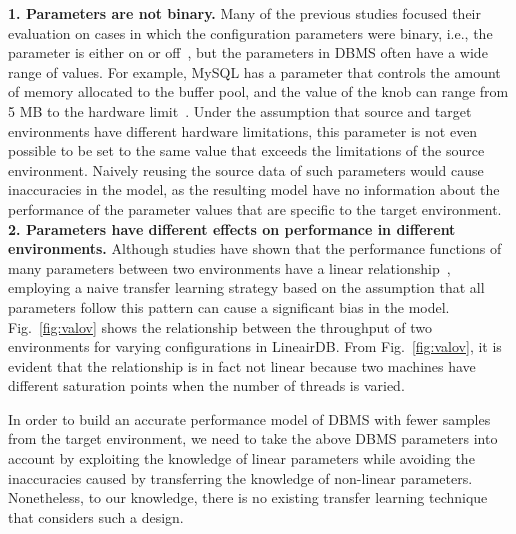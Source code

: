 \textbf{1. Parameters are not binary.}
Many of the previous studies focused their evaluation on cases in which the configuration parameters were binary, i.e., the parameter is either on or off~\cite{Valov, jamshidi, l2s}, but the parameters in DBMS often have a wide range of values.
For example, MySQL has a parameter that controls the amount of memory allocated to the buffer pool, and the value of the knob can range from 5 MB to the hardware limit~\cite{mysqlinnobuf}.
Under the assumption that source and target environments have different hardware limitations, this parameter is not even possible to be set to the same value that exceeds the limitations of the source environment.
Naively reusing the source data of such parameters would cause inaccuracies in the model, as the resulting model have no information about the performance of the parameter values that are specific to the target environment.
\textbf{2. Parameters have different effects on performance in different environments.}
Although studies have shown that the performance functions of many parameters between two environments have a linear relationship~\cite{Valov, jamshidi}, employing a naive transfer learning strategy based on the assumption that all parameters follow this pattern can cause a significant bias in the model.
Fig.~\ref{fig:valov} shows the relationship between the throughput of two environments for varying configurations in LineairDB.
From Fig.~\ref{fig:valov}, it is evident that the relationship is in fact not linear because two machines have different saturation points when the number of threads is varied.

In order to build an accurate performance model of DBMS with fewer samples from the target environment, we need to take the above DBMS parameters into account by exploiting the knowledge of linear parameters while avoiding the inaccuracies caused by transferring the knowledge of non-linear parameters.
Nonetheless, to our knowledge, there is no existing transfer learning technique that considers such a design.

